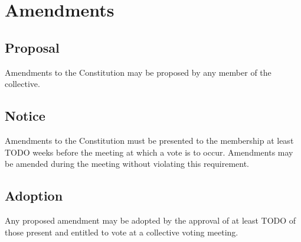 \chapter{Amendments}

\section{Proposal}\label{sec:proposal}
Amendments to the Constitution may be proposed by any member of the collective.

\section{Notice}\label{sec:notice}
Amendments to the Constitution must be presented to the membership at least TODO weeks before the meeting at which a vote is to occur. Amendments may be amended during the meeting without violating this requirement.

\section{Adoption}\label{sec:adoption}
Any proposed amendment may be adopted by the approval of at least TODO of those present and entitled to vote at a collective voting meeting.
